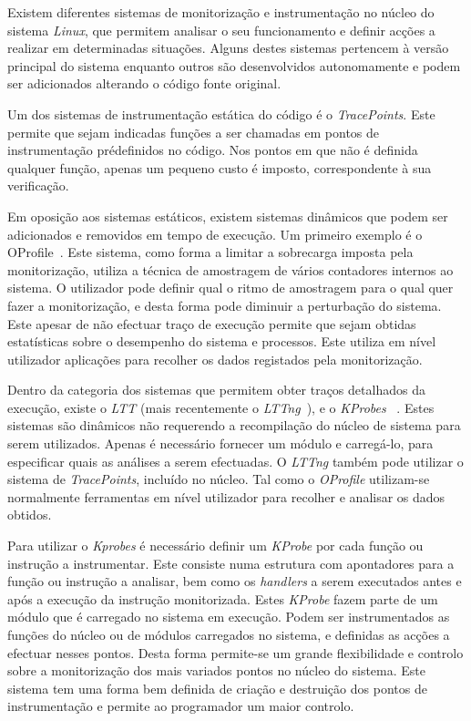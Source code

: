 \documentclass[a4paper]{llncs}
\newcommand{\td}[1]{\todo[inline]{#1}}
\begin{document}
Existem diferentes sistemas de monitorização e instrumentação no núcleo do sistema \textit{Linux}, que permitem analisar o seu funcionamento e definir acções a realizar em determinadas situações. Alguns destes sistemas pertencem à versão principal do sistema enquanto outros são desenvolvidos autonomamente e podem ser adicionados alterando o código fonte original. 

Um dos sistemas de instrumentação estática do código é o \textit{TracePoints}. Este permite que sejam indicadas funções a ser chamadas em pontos de instrumentação prédefinidos no código. Nos pontos em que não é definida qualquer função, apenas um pequeno custo é imposto, correspondente à sua verificação. 

Em oposição aos sistemas estáticos, existem sistemas dinâmicos que podem  ser adicionados e removidos em tempo de execução. Um primeiro exemplo é o OProfile~\cite{oprofile}. 
Este sistema, como forma a limitar a sobrecarga imposta pela monitorização, utiliza a técnica de amostragem de vários contadores internos ao sistema. O utilizador pode definir qual o ritmo de amostragem para o qual quer fazer a monitorização, e desta forma pode diminuir a perturbação do sistema. Este apesar de não efectuar traço de execução permite que sejam obtidas estatísticas sobre o desempenho do sistema e processos. Este  utiliza em nível utilizador aplicações para recolher os dados registados pela monitorização.

Dentro da categoria dos sistemas que permitem obter traços detalhados da execução, existe o \textit{LTT} (mais recentemente o \textit{LTTng}~\cite{Mathieu2009}), e o \textit{KProbes} ~\cite{kernel_debug_printk_on_fly}. %
Estes sistemas são dinâmicos não requerendo a recompilação do núcleo de sistema para serem utilizados. Apenas é necessário fornecer um módulo  e carregá-lo, para  especificar quais as análises a serem efectuadas. O \textit{LTTng} também pode utilizar o sistema de \textit{TracePoints}, incluído no núcleo. Tal como o \textit{OProfile} utilizam-se normalmente ferramentas em nível utilizador para recolher e analisar os dados obtidos.

Para utilizar o \textit{Kprobes} é necessário definir um \textit{KProbe} por cada função ou instrução a instrumentar. Este consiste numa estrutura com apontadores para a função ou instrução a analisar, bem como os \textit{handlers} a serem executados antes e após a execução da instrução monitorizada. Estes \textit{KProbe} fazem parte de um módulo que é carregado no sistema em execução. 
Podem ser instrumentados as funções do núcleo ou de módulos carregados no sistema, e definidas as acções a efectuar nesses pontos. 
Desta forma permite-se um grande flexibilidade e controlo sobre a monitorização dos mais variados pontos no núcleo do sistema.
Este sistema tem uma forma bem definida de criação e destruição dos pontos de instrumentação e permite ao programador um maior controlo.
\end{document}

